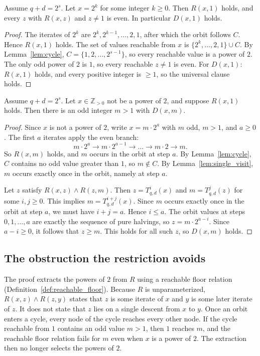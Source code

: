 \documentclass[runningheads]{llncs}
\begin{document}
\begin{lemma}[Powers of $2$]\label{lem:power_two_path}
Assume $q+d = 2^s$. Let $x = 2^k$ for some integer $k \ge 0$. Then
$R(x,1)$ holds, and every $z$ with $R(x,z)$ and $z \ne 1$ is even. In
particular $D(x,1)$ holds.
\end{lemma}
\begin{proof}
The iterates of $2^k$ are $2^k, 2^{k-1}, \dots, 2, 1$, after which the
orbit follows $C$. Hence $R(x,1)$ holds. The set of values reachable
from $x$ is $\{2^k, \dots, 2, 1\} \cup C$. By Lemma~\ref{lem:cycle},
$C = \{1,2,\dots,2^{s-1}\}$, so every reachable value is a power of $2$.
The only odd power of $2$ is $1$, so every reachable $z \ne 1$ is even.
For $D(x,1)$: $R(x,1)$ holds, and every positive integer is $\ge 1$, so
the universal clause holds.
\end{proof}

\begin{lemma}\label{lem:non_power_two_path}
Assume $q+d = 2^s$. Let $x \in \mathbb{Z}_{>0}$ not be a power of $2$,
and suppose $R(x,1)$ holds. Then there is an odd integer $m > 1$ with
$D(x,m)$.
\end{lemma}
\begin{proof}
Since $x$ is not a power of $2$, write $x = m \cdot 2^a$ with $m$ odd,
$m > 1$, and $a \ge 0$. The first $a$ iterates apply the even branch:
\[
m\cdot 2^{a} \to m\cdot 2^{a-1} \to \dots \to m\cdot 2 \to m.
\]
So $R(x,m)$ holds, and $m$ occurs in the orbit at step $a$. By
Lemma~\ref{lem:cycle}, $C$ contains no odd value greater than $1$, so
$m \notin C$. By Lemma~\ref{lem:single_visit}, $m$ occurs exactly once
in the orbit, namely at step $a$.

Let $z$ satisfy $R(x,z) \land R(z,m)$. Then $z = T_{q,d}^i(x)$ and $m = T_{q,d}^j(z)$ for some $i, j \ge 0$. This implies $m = T_{q,d}^{i+j}(x)$. Since $m$ occurs exactly once in the orbit at step $a$, we must have $i+j = a$. Hence $i \le a$. The orbit values at steps $0,1,\dots,a$ are exactly the sequence of pure halvings, so $z = m \cdot 2^{a-i}$. Since $a-i \ge 0$, it follows that $z \ge m$. This holds for all such $z$, so $D(x,m)$ holds.
\end{proof}

\subsection{The obstruction the restriction avoids}

The proof extracts the powers of $2$ from $R$ using a reachable floor relation (Definition~\ref{def:reachable_floor}). Because $R$ is
unparameterized, $R(x,z) \land R(z,y)$ states that $z$ is some iterate
of $x$ and $y$ is some later iterate of $z$. It does not state that $z$
lies on a single descent from $x$ to $y$. Once an orbit enters a cycle,
every node of the cycle reaches every other node. If the cycle reachable
from $1$ contains an odd value $m > 1$, then $1$ reaches $m$, and the
reachable floor relation fails for $m$ even when $x$ is a power of $2$. The
extraction then no longer selects the powers of $2$.
\end{document}
